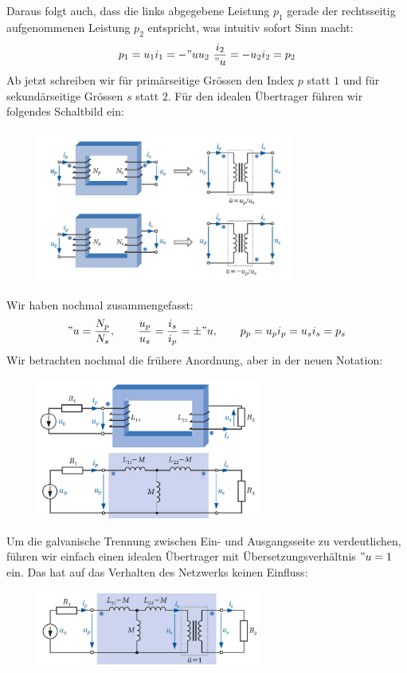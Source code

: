 Daraus folgt auch, dass die links abgegebene Leistung $p_1$ gerade der rechtsseitig aufgenommenen Leistung $p_2$ entspricht, was intuitiv sofort Sinn macht:
$$p_1 = u_1i_1 = -"u u_2~\frac{i_2}{"u} = -u_2 i_2 = p_2$$
Ab jetzt schreiben wir für primärseitige Grössen den Index $p$ statt $1$ und für sekundärseitige Grössen $s$ statt $2$. Für den idealen Übertrager führen wir folgendes Schaltbild ein:
\begin{figure}[H]
	\center
	\includegraphics[width=0.75\textwidth]{img/Tra5}
	\vspace{-0.2cm}
\end{figure}
Wir haben nochmal zusammengefasst:
$$"u = \frac{N_p}{N_s},\qquad \frac{u_p}{u_s} = \frac{i_s}{i_p} = \pm"u, \qquad p_p=u_pi_p=u_si_s=p_s$$
Wir betrachten nochmal die frühere Anordnung, aber in der neuen Notation:
\begin{figure}[H]
	\center
	\includegraphics[width=0.65\textwidth]{img/Tra6}
	\vspace{-0.2cm}
\end{figure}
Um die galvanische Trennung zwischen Ein- und Ausgangsseite zu verdeutlichen, führen wir einfach einen idealen Übertrager mit Übersetzungsverhältnis $"u=1$ ein. Das hat auf das Verhalten des Netzwerks keinen Einfluss:
\begin{figure}[H]
	\center
	\includegraphics[width=0.65\textwidth]{img/Tra7}
	\vspace{-0.2cm}
\end{figure}
